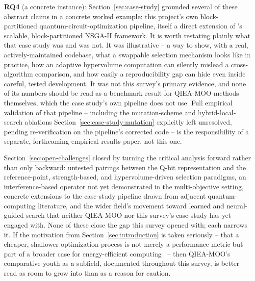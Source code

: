 \textbf{RQ4} (a concrete instance):
Section~\ref{sec:case-study} grounded several of these abstract claims
in a concrete worked example: this project's own block-partitioned
quantum-circuit-optimization pipeline, itself a direct extension of
\citet{ghlib2026scalable}'s scalable, block-partitioned NSGA-II
framework. It is worth restating plainly what that case study was and was
not. It was illustrative -- a way to show, with a real,
actively-maintained codebase, what a swappable selection mechanism
looks like in practice, how an adaptive hypervolume computation can
silently mislead a cross-algorithm comparison, and how easily a
reproducibility gap can hide even inside careful, tested development.
It was not this survey's primary evidence, and none of its numbers
should be read as a benchmark result for QIEA-MOO methods themselves,
which the case study's own pipeline does not use. Full empirical
validation of that pipeline -- including the mutation-scheme and
hybrid-local-search ablations Section~\ref{sec:case-study:mutation}
explicitly left unresolved, pending re-verification on the pipeline's
corrected code -- is the responsibility of a separate, forthcoming
empirical results paper, not this one.

Section~\ref{sec:open-challenges} closed by turning the critical
analysis forward rather than only backward: untested pairings between
the Q-bit representation and the reference-point, strength-based, and
hypervolume-driven selection paradigms,
an interference-based operator not yet demonstrated in the
multi-objective setting, concrete extensions
to the case-study pipeline drawn from adjacent quantum-computing
literature, and the wider field's movement toward learned and
neural-guided search that neither QIEA-MOO nor this survey's case study
has yet engaged with. None of these close the gap this survey opened
with; each narrows it. If the motivation from
Section~\ref{sec:introduction} is taken seriously -- that a cheaper,
shallower optimization process is not merely a performance metric but
part of a broader case for energy-efficient
computing~\citep{banciu2026aiot,moga2025rlmicrogrid} -- then QIEA-MOO's
comparative youth as a subfield, documented throughout this survey, is
better read as room to grow into than as a reason for caution.
